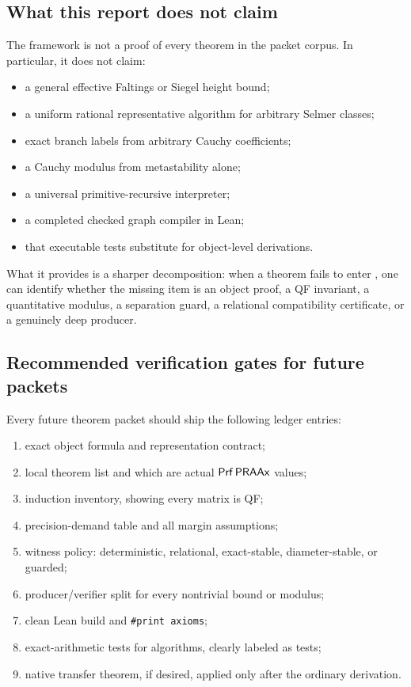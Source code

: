 \subsection{What this report does not claim}

The framework is not a proof of every theorem in the packet corpus.  In particular, it does not claim:
\begin{itemize}
  \item a general effective Faltings or Siegel height bound;
  \item a uniform rational representative algorithm for arbitrary Selmer classes;
  \item exact branch labels from arbitrary Cauchy coefficients;
  \item a Cauchy modulus from metastability alone;
  \item a universal primitive-recursive interpreter;
  \item a completed checked graph compiler in Lean;
  \item that executable tests substitute for object-level derivations.
\end{itemize}
What it provides is a sharper decomposition: when a theorem fails to enter \iPRA, one can identify whether the missing item is an object proof, a QF invariant, a quantitative modulus, a separation guard, a relational compatibility certificate, or a genuinely deep producer.

\subsection{Recommended verification gates for future packets}

Every future theorem packet should ship the following ledger entries:
\begin{enumerate}[label=(\arabic*)]
  \item exact object formula and representation contract;
  \item local theorem list and which are actual \(\mathsf{Prf}\,\mathsf{PRAAx}\) values;
  \item induction inventory, showing every matrix is QF;
  \item precision-demand table and all margin assumptions;
  \item witness policy: deterministic, relational, exact-stable, diameter-stable, or guarded;
  \item producer/verifier split for every nontrivial bound or modulus;
  \item clean Lean build and \texttt{\#print axioms};
  \item exact-arithmetic tests for algorithms, clearly labeled as tests;
  \item native transfer theorem, if desired, applied only after the ordinary derivation.
\end{enumerate}
